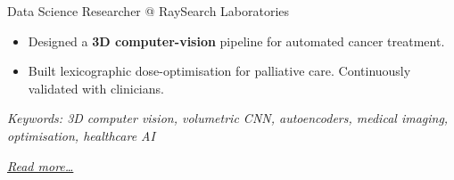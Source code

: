 \large{Data Science Researcher @ RaySearch Laboratories}

\normalsize
\begin{itemize}
    \item Designed a \textbf{3D computer-vision} pipeline for automated cancer treatment.
    \item Built lexicographic dose-optimisation for palliative care. Continuously validated with clinicians.
\end{itemize}

{\footnotesize\textit{Keywords: 3D computer vision, volumetric CNN, autoencoders, medical imaging, optimisation, healthcare AI}}

\hfill{\small{\textit{\hyperref[sec:raysearch]{Read more…}}}}

